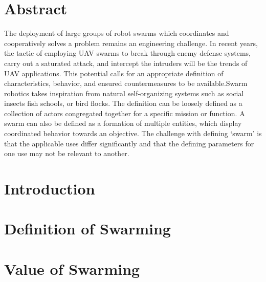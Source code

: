 \section*{Abstract}
The deployment of large groups of robot swarms which coordinates and cooperatively solves a problem remains an engineering challenge. In recent years, the tactic of employing UAV swarms to break through enemy defense systems, carry out a saturated attack, and intercept the intruders will be the trends of UAV applications. This potential calls for an appropriate definition of characteristics, behavior, and ensured countermeasures to be available.Swarm robotics takes inspiration from natural self-organizing systems such as social insects fish schools, or bird flocks. The definition can be loosely defined as a collection of actors congregated together for a specific mission or function. A swarm can also be defined as a formation of multiple entities, which display coordinated behavior towards an objective. The challenge with defining ‘swarm’ is that the applicable uses differ significantly and that the defining parameters for one use may not be relevant to another. 


\section*{Introduction}

\section*{Definition of Swarming}
\section*{Value of Swarming}
